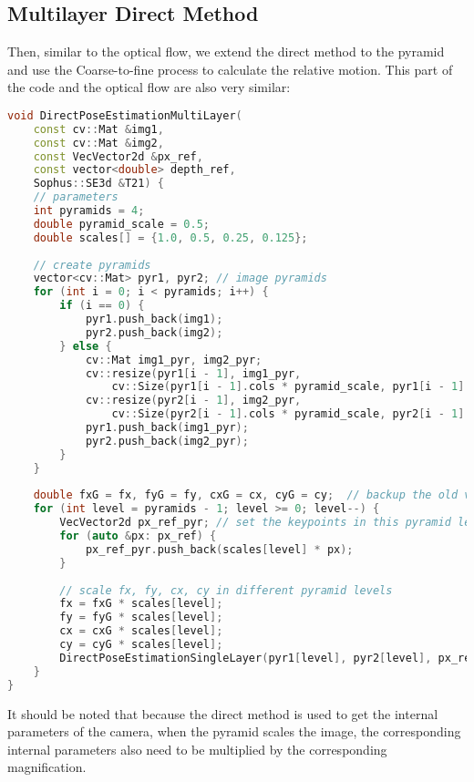 \subsection{Multilayer Direct Method}
Then, similar to the optical flow, we extend the direct method to the pyramid and use the Coarse-to-fine process to calculate the relative motion. This part of the code and the optical flow are also very similar:
\begin{lstlisting}[language=c++,caption=slambook2/ch8/direct_method.cpp（片段）]
void DirectPoseEstimationMultiLayer(
	const cv::Mat &img1,
	const cv::Mat &img2,
	const VecVector2d &px_ref,
	const vector<double> depth_ref,
	Sophus::SE3d &T21) {
	// parameters
	int pyramids = 4;
	double pyramid_scale = 0.5;
	double scales[] = {1.0, 0.5, 0.25, 0.125};
	
	// create pyramids
	vector<cv::Mat> pyr1, pyr2; // image pyramids
	for (int i = 0; i < pyramids; i++) {
		if (i == 0) {
			pyr1.push_back(img1);
			pyr2.push_back(img2);
		} else {
			cv::Mat img1_pyr, img2_pyr;
			cv::resize(pyr1[i - 1], img1_pyr,
				cv::Size(pyr1[i - 1].cols * pyramid_scale, pyr1[i - 1].rows * pyramid_scale));
			cv::resize(pyr2[i - 1], img2_pyr,
				cv::Size(pyr2[i - 1].cols * pyramid_scale, pyr2[i - 1].rows * pyramid_scale));
			pyr1.push_back(img1_pyr);
			pyr2.push_back(img2_pyr);
		}
	}
	
	double fxG = fx, fyG = fy, cxG = cx, cyG = cy;  // backup the old values
	for (int level = pyramids - 1; level >= 0; level--) {
		VecVector2d px_ref_pyr; // set the keypoints in this pyramid level
		for (auto &px: px_ref) {
			px_ref_pyr.push_back(scales[level] * px);
		}
		
		// scale fx, fy, cx, cy in different pyramid levels
		fx = fxG * scales[level];
		fy = fyG * scales[level];
		cx = cxG * scales[level];
		cy = cyG * scales[level];
		DirectPoseEstimationSingleLayer(pyr1[level], pyr2[level], px_ref_pyr, depth_ref, T21);
	}	
}
\end{lstlisting}
It should be noted that because the direct method is used to get the internal parameters of the camera, when the pyramid scales the image, the corresponding internal parameters also need to be multiplied by the corresponding magnification.

